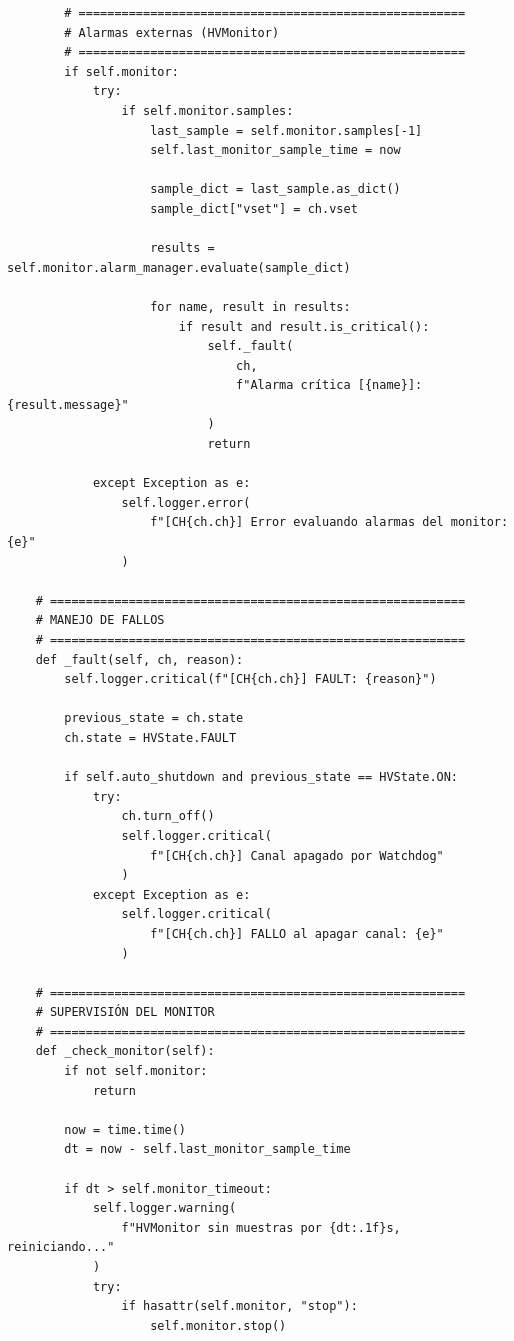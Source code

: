 \documentclass{article}
\begin{document}
\begin{lstlisting}
        # ======================================================
        # Alarmas externas (HVMonitor)
        # ======================================================
        if self.monitor:
            try:
                if self.monitor.samples:
                    last_sample = self.monitor.samples[-1]
                    self.last_monitor_sample_time = now

                    sample_dict = last_sample.as_dict()
                    sample_dict["vset"] = ch.vset

                    results = self.monitor.alarm_manager.evaluate(sample_dict)

                    for name, result in results:
                        if result and result.is_critical():
                            self._fault(
                                ch,
                                f"Alarma crítica [{name}]: {result.message}"
                            )
                            return

            except Exception as e:
                self.logger.error(
                    f"[CH{ch.ch}] Error evaluando alarmas del monitor: {e}"
                )

    # ==========================================================
    # MANEJO DE FALLOS
    # ==========================================================
    def _fault(self, ch, reason):
        self.logger.critical(f"[CH{ch.ch}] FAULT: {reason}")

        previous_state = ch.state
        ch.state = HVState.FAULT

        if self.auto_shutdown and previous_state == HVState.ON:
            try:
                ch.turn_off()
                self.logger.critical(
                    f"[CH{ch.ch}] Canal apagado por Watchdog"
                )
            except Exception as e:
                self.logger.critical(
                    f"[CH{ch.ch}] FALLO al apagar canal: {e}"
                )

    # ==========================================================
    # SUPERVISIÓN DEL MONITOR
    # ==========================================================
    def _check_monitor(self):
        if not self.monitor:
            return

        now = time.time()
        dt = now - self.last_monitor_sample_time

        if dt > self.monitor_timeout:
            self.logger.warning(
                f"HVMonitor sin muestras por {dt:.1f}s, reiniciando..."
            )
            try:
                if hasattr(self.monitor, "stop"):
                    self.monitor.stop()


\end{lstlisting}
\end{document}
